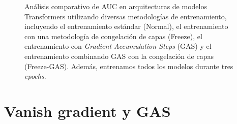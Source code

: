 \begin{figure}[h]
	\centering
	

	\caption[Comparación del AUC de modelos Transformers entrenados con 3 \textit{epochs}]{Análisis comparativo de AUC en arquitecturas de modelos Transformers utilizando diversas metodologías de entrenamiento, incluyendo el entrenamiento estándar (Normal), el entrenamiento con una metodología de congelación de capas (Freeze), el entrenamiento con \textit{Gradient Accumulation Steps} (GAS) y el entrenamiento combinando GAS con la congelación de capas (Freeze-GAS). Además, entrenamos todos los modelos durante tres \textit{epochs}.}
	\label{fig:comparison_3_3pochs}
\end{figure}

\section{Vanish gradient y GAS}

